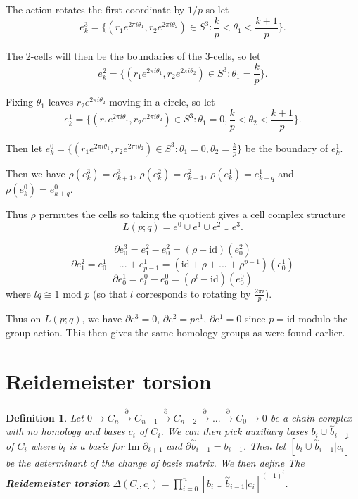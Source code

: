 \documentclass{article}
\newtheorem{definition}[theorem]{Definition}
\begin{document}
\noindent The action rotates the first coordinate by $1/p$ so let \[e_k^3=\{(r_1e^{2\pi i\theta_1},r_2e^{2\pi i\theta_2})\in S^3:\frac{k}{p}<\theta_1<\frac{k+1}{p}\}.\]

\noindent The $2$-cells will then be the boundaries of the $3$-cells, so let \[e_k^2=\{(r_1e^{2\pi i\theta_1},r_2e^{2\pi i\theta_2})\in S^3:\theta_1=\frac{k}{p}\}.\]

\noindent Fixing $\theta_1$ leaves $r_2e^{2\pi i\theta_2}$ moving in a circle, so let \[e_k^1=\{(r_1e^{2\pi i\theta_1},r_2e^{2\pi i\theta_2})\in S^3:\theta_1=0,\frac{k}{p}<\theta_2<\frac{k+1}{p}\}.\]

\noindent Then let $e_k^0=\{(r_1e^{2\pi i\theta_1},r_2e^{2\pi i\theta_2})\in S^3:\theta_1=0,\theta_2=\frac{k}{p}\}$ be the boundary of $e_k^1$.

\noindent Then we have $\rho(e_k^3)=e_{k+1}^3$, $\rho(e_k^2)=e_{k+1}^2$, $\rho(e_k^1)=e_{k+q}^1$ and $\rho(e_k^0)=e_{k+q}^0$.

\noindent Thus $\rho$ permutes the cells so taking the quotient gives a cell complex structure \[L(p;q)=e^0\cup e^1\cup e^2\cup e^3.\]

\[\partial e_0^3=e_1^2-e_0^2=(\rho-\text{id})(e_0^2)\]
\[\partial e_1^2=e_0^1+...+e_{p-1}^1=(\text{id}+\rho+...+\rho^{p-1})(e_0^1)\]
\[\partial e_0^1=e_l^0-e_0^0=(\rho^l-\text{id})(e_0^0)\] where $lq\cong1\text{ mod }p$ (so that $l$ corresponds to rotating by $\frac{2\pi i}{p}$).

\noindent Thus on $L(p;q)$, we have $\partial e^3=0$, $\partial e^2=pe^1$, $\partial e^1=0$ since $p=\text{id}$ modulo the group action. This then gives the same homology groups as were found earlier.

\section{Reidemeister torsion}
\begin{definition}
Let $0\to C_n\overset{\partial}{\to}C_{n-1}\overset{\partial}{\to}C_{n-2}\overset{\partial}{\to}...\overset{\partial}{\to}C_{0}\to 0$ be a chain complex with no homology and bases $c_i$ of $C_i$. We can then pick auxiliary bases $b_i\cup\overset{\sim}{b}_{i-1}$ of $C_i$ where $b_i$ is a basis for $\text{Im }\partial_{i+1}$ and $\partial\overset{\sim}{b}_{i-1}=b_{i-1}$. Then let $[b_i\cup\overset{\sim}{b}_{i-1}|c_i]$ be the determinant of the change of basis matrix. We then define The \textbf{Reidemeister torsion} $\Delta(C_.,c_.)=\prod_{i=0}^n[b_i\cup\overset{\sim}{b}_{i-1}|c_i]^{(-1)^i}$.
\end{definition}
\end{document}
